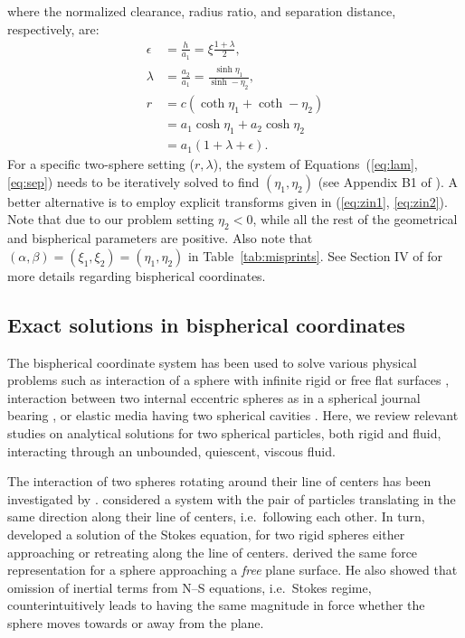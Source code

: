 \documentclass[../thesis.tex]{subfiles}
\begin{document}
where the normalized clearance, radius ratio, and separation distance, respectively, are:
\begin{align}
\epsilon &= \frac{h}{a_1} = \xi\frac{1+\lambda}{2}, \nonumber
\\
\lambda &= \frac{a_2}{a_1} = \frac{\sinh\eta_1}{\sinh-\eta_2}, \label{eq:lam}
\\
r &= c(\coth\eta_1+\coth-\eta_2) \nonumber \\ 
  &= a_1\cosh\eta_1+a_2\cosh\eta_2 \label{eq:sep} \\ 
  &= a_1(1+\lambda+\epsilon).  \nonumber
\end{align}
For a specific two-sphere setting ($r,\lambda$), the system of Equations~(\ref{eq:lam}, \ref{eq:sep}) needs to be iteratively solved to find $(\eta_1,\eta_2)$ (see Appendix B1 of \cite{GMS20}). A better alternative is to employ explicit \cite{Z80} transforms given in (\ref{eq:zin1}, \ref{eq:zin2}). Note that due to our problem setting $\eta_2<0$, while all the rest of the geometrical and bispherical parameters are positive. Also note that $(\alpha,\beta)=(\xi_1,\xi_2)=(\eta_1,\eta_2)$ in Table~\ref{tab:misprints}. See Section IV of \cite{MS12} for more details regarding bispherical coordinates.



\subsection{Exact solutions in bispherical coordinates\label{sec:bi}}
The bispherical coordinate system has been used to solve various physical problems such as interaction of a sphere with infinite rigid or free flat surfaces \cite{B61}, interaction between two internal eccentric spheres as in a spherical journal bearing \cite{J15}, or elastic media having two spherical cavities \cite{SS52}. Here, we review relevant studies on analytical solutions for two spherical particles, both rigid and fluid, interacting through an unbounded, quiescent, viscous fluid.

The interaction of two spheres rotating around their line of centers has been investigated by \cite{J15}. \cite{SJ26} considered a system with the pair of particles translating in the same direction along their line of centers, i.e.\ following each other. In turn, \cite{M61} developed a solution of the Stokes equation, for two rigid spheres either approaching or retreating along the line of centers. \cite{B61} derived the same force representation for a sphere approaching a \textit{free} plane surface. He also showed that omission of inertial terms from N--S equations, i.e.\ Stokes regime, counterintuitively leads to having the same magnitude in force whether the sphere moves towards or away from the plane.
\end{document}
